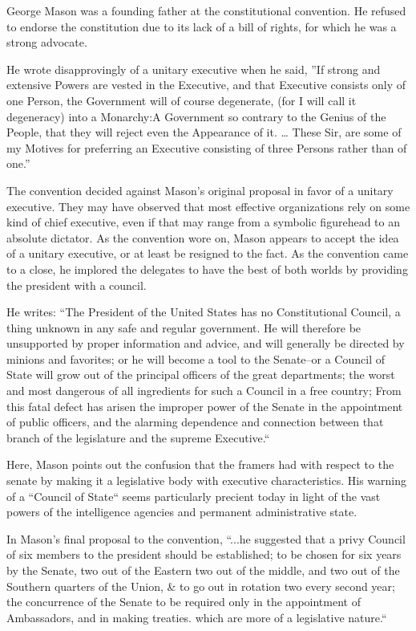 \documentclass{article}
\begin{document}
George Mason was a founding father at the constitutional convention. He refused to endorse the constitution due to its lack of a bill of rights, for which he was a strong advocate.

He wrote disapprovingly of a unitary executive when he said, ”If strong and extensive Powers are vested in the Executive, and that Executive consists only of one Person, the Government will of course degenerate, (for I will call it degeneracy) into a Monarchy:A Government so contrary to the Genius of the People, that they will reject even the Appearance of it. … These Sir, are some of my Motives for preferring an Executive consisting of three Persons rather than of one.”\cite{Mason}

The convention decided against Mason's original proposal in favor of a unitary executive. They may have observed that most effective organizations rely on some kind of chief executive, even if that may range from a symbolic figurehead to an absolute dictator. As the convention wore on, Mason appears to accept the idea of a unitary executive, or at least be resigned to the fact. As the convention came to a close, he implored the delegates to  have the best of both worlds by providing the president with a council.

He writes: “The President of the United States has no Constitutional Council, a thing unknown in any safe and regular government. He will therefore be unsupported by proper information and advice, and will generally be directed by minions and favorites; or he will become a tool to the Senate--or a Council of State will grow out of the principal officers of the great departments; the worst and most dangerous of all ingredients for such a Council in a free country; From this fatal defect has arisen the improper power of the Senate in the appointment of public officers, and the alarming dependence and connection between that branch of the legislature and the supreme Executive.“\cite{Mason_Objection}

Here, Mason points out the confusion that the framers had with respect to the senate by making it a legislative body with executive characteristics. His warning of a “Council of State“ seems particularly precient today in light of the vast powers of the intelligence agencies and permanent administrative state.\cite{Cooper}

In Mason's final proposal to the convention, “...he suggested that a privy Council of six members to the president should be established; to be chosen for six years by the Senate, two out of the Eastern two out of the middle, and two out of the Southern quarters of the Union, \& to go out in rotation two every second year; the concurrence of the Senate to be required only in the appointment of Ambassadors, and in making treaties. which are more of a legislative nature.“\cite{Madison}
\end{document}
